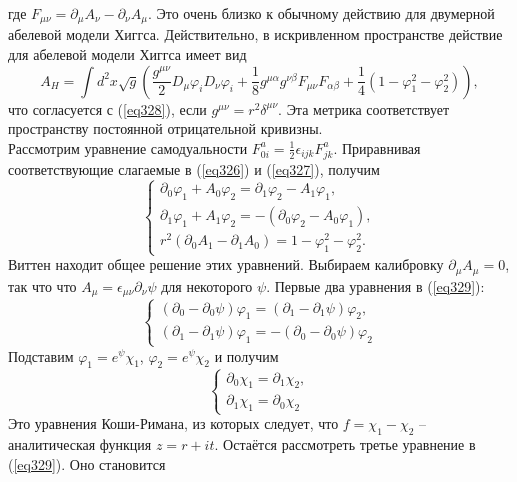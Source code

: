\documentclass[12pt]{article}
\theoremstyle{definition}
\begin{document}
где $F_{\mu\nu}=\partial_\mu A_\nu-\partial_\nu A_\mu$. Это очень близко к обычному действию для двумерной абелевой модели Хиггса. Действительно, в искривленном пространстве действие для абелевой модели Хиггса имеет вид
\begin{equation}
    A_H=\int d^2x\sqrt{g}\left(\frac{g^{\mu\nu}}{2}D_\mu\varphi_iD_\nu\varphi_i+\frac{1}{8}g^{\mu\alpha}g^{\nu\beta}F_{\mu\nu}F_{\alpha\beta}+\frac{1}{4}(1-\varphi_1^2-\varphi_2^2)\right),
\end{equation}
что согласуется с (\ref{eq328}), если $g^{\mu\nu}=r^2\delta^{\mu\nu}$. Эта метрика соответствует пространству постоянной отрицательной кривизны.\\
Рассмотрим уравнение самодуальности $F^a_{0i}=\frac{1}{2}\epsilon_{ijk}F_{jk}^a$. Приравнивая соответствующие слагаемые в (\ref{eq326}) и (\ref{eq327}), получим
\begin{equation}\label{eq329}
    \begin{cases}
        \partial_0\varphi_1+A_0\varphi_2=\partial_1\varphi_2-A_1\varphi_1,\\
        \partial_1\varphi_1+A_1\varphi_2=-(\partial_0\varphi_2-A_0\varphi_1),\\
        r^2(\partial_0A_1-\partial_1A_0)=1-\varphi_1^2-\varphi_2^2.
    \end{cases}
\end{equation}
Виттен находит общее решение этих уравнений. Выбираем калибровку $\partial_\mu A_\mu=0$, так что что $A_\mu=\epsilon_{\mu\nu}\partial_\nu\psi$ для некоторого $\psi$. Первые два уравнения в (\ref{eq329}):
\begin{equation}
\begin{cases}
    (\partial_0-\partial_0\psi)\varphi_1=(\partial_1-\partial_1\psi)\varphi_2,\\
    (\partial_1-\partial_1\psi)\varphi_1=-(\partial_0-\partial_0\psi)\varphi_2
\end{cases}
\end{equation}
Подставим $\varphi_1=e^\psi\chi_1$, $\varphi_2=e^\psi\chi_2$ и получим
\begin{equation}
    \begin{cases}
        \partial_0\chi_1=\partial_1\chi_2,\\
        \partial_1\chi_1=\partial_0\chi_2
    \end{cases}
\end{equation}
Это уравнения Коши-Римана, из которых следует, что $f=\chi_1-\chi_2$ -- аналитическая функция $z=r+it$. Остаётся рассмотреть третье уравнение в (\ref{eq329}). Оно становится
\end{document}
